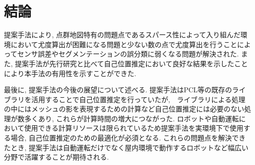 \chapter{結論}
提案手法により, 点群地図特有の問題点であるスパース性によって入り組んだ環境において尤度算出が困難になる問題と少ない数の点で尤度算出を行うことによってセンサ誤差やセグメンテーションの誤分類に弱くなる問題が解決された. また, 提案手法が先行研究と比べて自己位置推定において良好な結果を示したことにより本手法の有用性を示すことができた. \par 最後に, 提案手法の今後の展望について述べる. 提案手法はPCL等の既存のライブラリを活用することで自己位置推定を行っていたが,　ライブラリによる処理の中にはメッシュの影を表現するための計算など自己位置推定には必要のない処理が数多くあり, これらが計算時間の増大につながった. ロボットや自動運転において使用できる計算リソースは限られているため提案手法を実環境下で使用する場合, 自己位置推定のための最適化が必須となる. これらの問題点を解決できたとき, 提案手法は自動運転だけでなく屋内環境で動作するロボットなど幅広い分野で活躍することが期待される.
